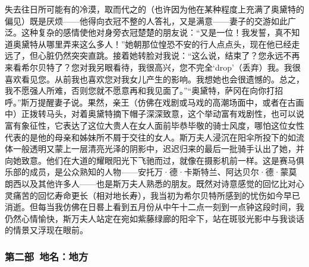 失去往日所可能有的冷漠，取而代之的（也许因为他在某种程度上充满了奥黛特的偏见）既是厌烦——他得向衣冠不整的人答礼，又是满意——妻子的交游如此广泛。这种复杂的感情使他对身旁衣冠楚楚的朋友说：“又是一位！我发誓，真不知道奥黛特从哪里弄来这么多人！”她朝那位惶恐不安的行人点点头，现在他已经走远了，但心脏仍然突突直跳。接着她转脸对我说：“这么说，结束了？您永远不再来看希尔贝特了？您对我另眼看待，我很高兴，您不完全‘drop’（丢弃）我。我很喜欢看见您。从前我也喜欢您对我女儿产生的影响。我想她也会很遗憾的。总之，我不愿强人所难，否则您就不愿意再和我见面了。”“奥黛特，萨冈在向你打招呼。”斯万提醒妻子说。果然，亲王（仿佛在戏剧或马戏的高潮场面中，或者在古画中）正拨转马头，对着奥黛特摘下帽子深深致意，这个举动富有戏剧性，也可以说富有象征性，它表达了这位大贵人在女人面前毕恭毕敬的骑士风度，哪怕这位女性代表的是他的母亲和姊妹所不屑于交往的女人。斯万夫人浸沉在阳伞所投下的如流体一般透明又蒙上一层清亮光泽的阴影中，迟迟归来的最后一批骑手认出了她，并向她致意。他们在大道的耀眼阳光下飞驰而过，就像在摄影机前一样。这是赛马俱乐部的成员，是公众熟知的人物——安托万·德·卡斯特兰、阿达贝尔·德·蒙莫朗西以及其他许多人——也是斯万夫人熟悉的朋友。既然对诗意感觉的回忆比对心灵痛苦的回忆寿命更长（相对地长寿），我当初为希尔贝特所感到的忧伤如今早已消逝。但每当我仿佛在日晷上看到五月份从中午十二点一刻到一点钟这段时间，我仍然心情愉快，斯万夫人站定在宛如紫藤绿廊的阳伞下，站在斑驳光影中与我谈话的情景又浮现在眼前。


\subsubsection*{第二部\ 地名：地方}


